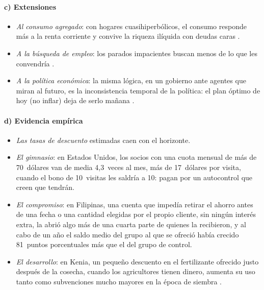 \documentclass[11pt]{article}
\begin{document}
\paragraph{c) Extensiones}

\begin{itemize}
\item \emph{Al consumo agregado}: con hogares cuasihiperbólicos, el consumo responde más a la renta corriente y convive la riqueza ilíquida con deudas caras .
\item \emph{A la búsqueda de empleo}: los parados impacientes buscan menos de lo que les convendría\nocite{DellaVignaPaserman2005Job} .
\item \emph{A la política económica}: la misma lógica, en un gobierno ante agentes que miran al futuro, es la inconsistencia temporal de la política: el plan óptimo de hoy (no inflar) deja de serlo mañana\nocite{KydlandPrescott1977Rules} .
\end{itemize}

\paragraph{d) Evidencia empírica}

\begin{itemize}
\item \emph{Las tasas de descuento} estimadas caen con el horizonte\nocite{FrederickEtAl2002Time}.
\item \emph{El gimnasio}: en Estados Unidos, los socios con una cuota mensual de más de 70~dólares van de media 4,3~veces al mes, más de 17~dólares por visita, cuando el bono de 10~visitas les saldría a 10: pagan por un autocontrol que creen que tendrán\nocite{DellaVignaMalmendier2006Paying}.
\item \emph{El compromiso}: en Filipinas, una cuenta que impedía retirar el ahorro antes de una fecha o una cantidad elegidas por el propio cliente, sin ningún interés extra, la abrió algo más de una cuarta parte de quienes la recibieron, y al cabo de un año el saldo medio del grupo al que se ofreció había crecido 81~puntos porcentuales más que el del grupo de control\nocite{AshrafKarlanYin2006Tying}.
\item \emph{El desarrollo}: en Kenia, un pequeño descuento en el fertilizante ofrecido justo después de la cosecha, cuando los agricultores tienen dinero, aumenta su uso tanto como subvenciones mucho mayores en la época de siembra\nocite{DufloKremerRobinson2011} .
\end{itemize}
\end{document}
